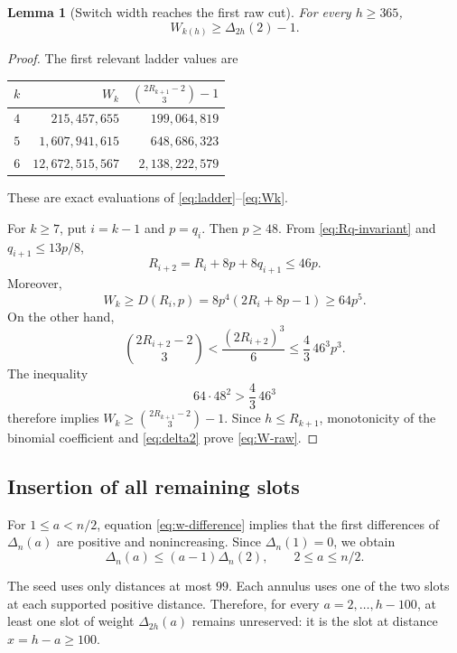 \documentclass[11pt]{article}
\newtheorem{lemma}[theorem]{Lemma}
\theoremstyle{definition}
\theoremstyle{remark}
\newcommand{\C}[2]{\binom{#1}{#2}}
\begin{document}
\begin{lemma}[Switch width reaches the first raw cut]\label{lem:width-raw}
For every $h\ge365$,
\begin{equation}\label{eq:W-raw}
  W_{k(h)}\ge\Delta_{2h}(2)-1.
\end{equation}
\end{lemma}

\begin{proof}
The first relevant ladder values are
\begin{center}
\begin{tabular}{@{}r r r@{}}
\toprule
$k$ & $W_k$ & $\binom{2R_{k+1}-2}{3}-1$\\
\midrule
$4$ & $215{,}457{,}655$ & $199{,}064{,}819$\\
$5$ & $1{,}607{,}941{,}615$ & $648{,}686{,}323$\\
$6$ & $12{,}672{,}515{,}567$ & $2{,}138{,}222{,}579$\\
\bottomrule
\end{tabular}
\end{center}
These are exact evaluations of \eqref{eq:ladder}--\eqref{eq:Wk}.

For $k\ge7$, put $i=k-1$ and $p=q_i$.  Then $p\ge48$.  From
\eqref{eq:Rq-invariant} and $q_{i+1}\le13p/8$,
\[
  R_{i+2}=R_i+8p+8q_{i+1}\le46p.
\]
Moreover,
\[
  W_k\ge D(R_i,p)
  =8p^4(2R_i+8p-1)
  \ge64p^5.
\]
On the other hand,
\[
  \C{2R_{i+2}-2}{3}
  <\frac{(2R_{i+2})^3}{6}
  \le\frac43\,46^3p^3.
\]
The inequality
\[
  64\cdot48^2>\frac43\,46^3
\]
therefore implies
$W_k\ge\binom{2R_{k+1}-2}{3}-1$.  Since
$h\le R_{k+1}$, monotonicity of the binomial coefficient and
\eqref{eq:delta2} prove \eqref{eq:W-raw}.
\end{proof}

\subsection{Insertion of all remaining slots}

For $1\le a<n/2$, equation \eqref{eq:w-difference} implies that the first
differences of $\Delta_n(a)$ are positive and nonincreasing.  Since
$\Delta_n(1)=0$, we obtain
\begin{equation}\label{eq:concavity-bound}
  \Delta_n(a)\le(a-1)\Delta_n(2),
  \qquad 2\le a\le n/2.
\end{equation}

The seed uses only distances at most $99$.  Each annulus uses one of the two
slots at each supported positive distance.  Therefore, for every
$a=2,\ldots,h-100$, at least one slot of weight $\Delta_{2h}(a)$ remains
unreserved: it is the slot at distance $x=h-a\ge100$.
\end{document}
